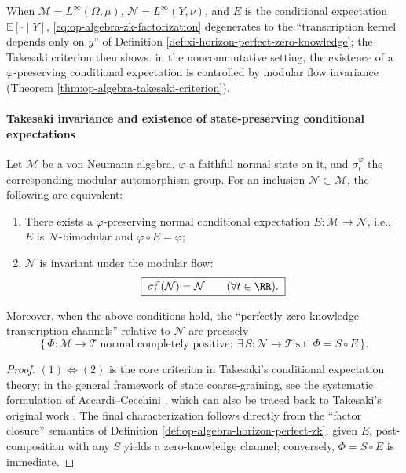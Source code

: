 \begin{remark}\label{rem:op-algebra-zk-vs-measure}
When \(\mathcal{M}=L^\infty(\Omega,\mu)\), \(\mathcal{N}=L^\infty(Y,\nu)\), and \(E\) is the conditional expectation \(\mathbb{E}[\cdot\mid Y]\),
\eqref{eq:op-algebra-zk-factorization} degenerates to the ``transcription kernel depends only on \(y\)'' of Definition \ref{def:xi-horizon-perfect-zero-knowledge};
the Takesaki criterion then shows: in the noncommutative setting, the existence of a \(\varphi\)-preserving conditional expectation is controlled by modular flow invariance (Theorem \ref{thm:op-algebra-takesaki-criterion}).
\end{remark}

\paragraph{Takesaki invariance and existence of state-preserving conditional expectations}
\begin{theorem}\label{thm:op-algebra-takesaki-criterion}
Let \(\mathcal{M}\) be a von Neumann algebra, \(\varphi\) a faithful normal state on it, and \(\sigma_t^\varphi\) the corresponding modular automorphism group.
For an inclusion \(\mathcal{N}\subset\mathcal{M}\), the following are equivalent:
\begin{enumerate}
  \item There exists a \(\varphi\)-preserving normal conditional expectation \(E:\mathcal{M}\to\mathcal{N}\), i.e., \(E\) is \(\mathcal{N}\)-bimodular and \(\varphi\circ E=\varphi\);
  \item \(\mathcal{N}\) is invariant under the modular flow:
  \begin{equation}\label{eq:op-algebra-modular-invariance}
  \boxed{\;\sigma_t^\varphi(\mathcal{N})=\mathcal{N}\qquad(\forall t\in\RR).\;}
  \end{equation}
\end{enumerate}
Moreover, when the above conditions hold,
the ``perfectly zero-knowledge transcription channels'' relative to \(\mathcal{N}\) are precisely
\[
\bigl\{\,\Phi:\mathcal{M}\to\mathcal{T}\ \text{normal completely positive}:\ \exists\,S:\mathcal{N}\to\mathcal{T}\ \text{s.t.}\ \Phi=S\circ E\,\bigr\}.
\]
\end{theorem}

\begin{proof}
\((1)\Leftrightarrow(2)\) is the core criterion in Takesaki's conditional expectation theory;
in the general framework of state coarse-graining, see the systematic formulation of Accardi--Cecchini \cite{AccardiCecchini1982ConditionalExpectationsTakesaki},
which can also be traced back to Takesaki's original work \cite{Takesaki1972ConditionalExpectationsVNA}.
The final characterization follows directly from the ``factor closure'' semantics of Definition \ref{def:op-algebra-horizon-perfect-zk}: given \(E\), post-composition with any \(S\) yields a zero-knowledge channel; conversely, \(\Phi=S\circ E\) is immediate.
\qedhere
\end{proof}

